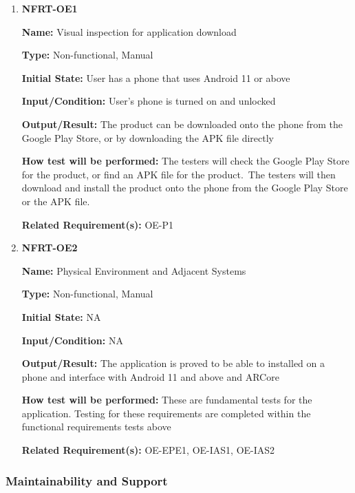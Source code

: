 \documentclass[12pt, titlepage]{article}
\begin{document}
\begin{enumerate}
\item{\textbf{NFRT-OE1}}

\textbf{Name:} Visual inspection for application download

\textbf{Type:} Non-functional, Manual

\textbf{Initial State:} User has a phone that uses Android 11 or above

\textbf{Input/Condition:} User's phone is turned on and unlocked

\textbf{Output/Result:} The product can be downloaded onto the phone from the Google Play Store, or by downloading the APK file directly

\textbf{How test will be performed:} The testers will check the Google Play Store for the product, or find an APK file for the product.\
The testers will then download and install the product onto the phone from the Google Play Store or the APK file.

\textbf{Related Requirement(s):} OE-P1

\item{\textbf{NFRT-OE2}}

\textbf{Name:} Physical Environment and Adjacent Systems 

\textbf{Type:} Non-functional, Manual

\textbf{Initial State:} NA

\textbf{Input/Condition:} NA

\textbf{Output/Result:} The application is proved to be able to installed on a phone and interface with Android 11 and above and ARCore

\textbf{How test will be performed:} These are fundamental tests for the application. Testing for these requirements are completed within the functional requirements tests above

\textbf{Related Requirement(s):} OE-EPE1, OE-IAS1, OE-IAS2
\end{enumerate}

\subsubsection{Maintainability and Support}
\end{document}
